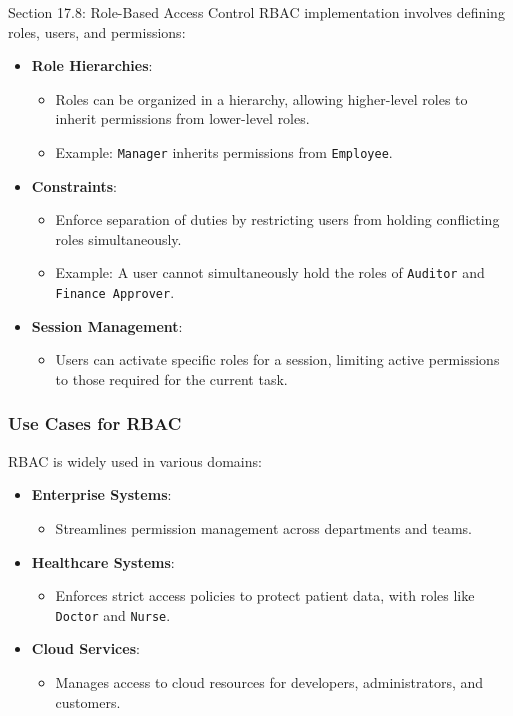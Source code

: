 \begin{notes}{Section 17.8: Role-Based Access Control}
    RBAC implementation involves defining roles, users, and permissions:
    \begin{itemize}
        \item \textbf{Role Hierarchies}:
        \begin{itemize}
            \item Roles can be organized in a hierarchy, allowing higher-level roles to inherit permissions from lower-level roles.
            \item Example: \texttt{Manager} inherits permissions from \texttt{Employee}.
        \end{itemize}
        \item \textbf{Constraints}:
        \begin{itemize}
            \item Enforce separation of duties by restricting users from holding conflicting roles simultaneously.
            \item Example: A user cannot simultaneously hold the roles of \texttt{Auditor} and \texttt{Finance Approver}.
        \end{itemize}
        \item \textbf{Session Management}:
        \begin{itemize}
            \item Users can activate specific roles for a session, limiting active permissions to those required for the current task.
        \end{itemize}
    \end{itemize}
    
    \subsubsection*{Use Cases for RBAC}
    
    RBAC is widely used in various domains:
    \begin{itemize}
        \item \textbf{Enterprise Systems}:
        \begin{itemize}
            \item Streamlines permission management across departments and teams.
        \end{itemize}
        \item \textbf{Healthcare Systems}:
        \begin{itemize}
            \item Enforces strict access policies to protect patient data, with roles like \texttt{Doctor} and \texttt{Nurse}.
        \end{itemize}
        \item \textbf{Cloud Services}:
        \begin{itemize}
            \item Manages access to cloud resources for developers, administrators, and customers.
        \end{itemize}
    \end{itemize}
    

\end{notes}
